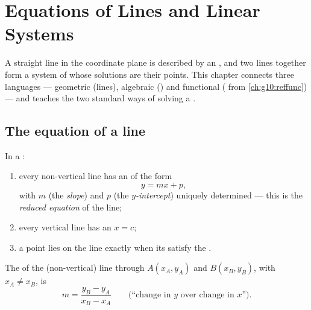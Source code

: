 \chapter{Equations of Lines and Linear Systems}\label{ch:g10:lines}

A straight line in the coordinate plane is described by an , and
two lines together form a system of  whose solutions are their
 points. This chapter connects three languages --- geometric
(lines), algebraic () and functional ( from
\cref{ch:g10:reffunc}) --- and teaches the two standard ways of solving a
.

\section{The equation of a line}

\begin{theorem}\label{thm:g10:lines:reduced}
In a :
\begin{enumerate}
  \item every non-vertical line has an  of the form
        \[
        y = mx + p ,
        \]
        with $m$ (the \emph{slope}) and $p$ (the
        \emph{$y$-intercept}) uniquely determined --- this is the
        \emph{reduced equation} of the line;
  \item every vertical line has an  $x = c$;
  \item a point lies on the line exactly when its  satisfy the
        .
\end{enumerate}
\end{theorem}
\admitted

\begin{proposition}\label{prop:g10:lines:slope}
The  of the (non-vertical) line through $A(x_A, y_A)$ and
$B(x_B, y_B)$, with $x_A \neq x_B$, is
\[
m = \frac{y_B - y_A}{x_B - x_A}
\qquad
\text{(``change in $y$ over change in $x$'').}
\]
\end{proposition}

